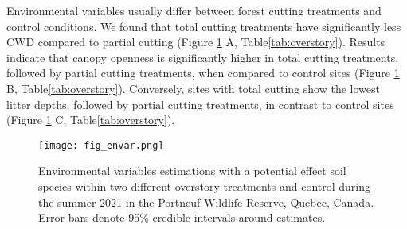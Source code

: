 Environmental variables usually differ between forest cutting treatments and control conditions. We found that total cutting treatments have significantly less CWD compared to partial cutting (Figure \ref{fig:envar} A, Table\ref{tab:overstory}). 
Results indicate that canopy openness is significantly higher in total cutting treatments, followed by partial cutting treatments, when compared to control sites (Figure \ref{fig:envar} B, Table\ref{tab:overstory}). 
Conversely, sites with total cutting show the lowest litter depths, followed by partial cutting treatments, in contrast to control sites (Figure \ref{fig:envar} C, Table\ref{tab:overstory}).

\vspace{0.5cm}

\begin{figure}[ht]
  \centering
  \texttt{[image: fig\_envar.png]}
  \caption[Environmental variables estimations with a potential effect soil species within two different overstory treatments and control.]
  {Environmental variables estimations with a potential effect soil species within two different overstory treatments and control 
  during the summer 2021 in the Portneuf Wildlife Reserve, Quebec, Canada. Error bars denote 95\% credible intervals around estimates.}
  \label{fig:envar}
\end{figure}

\vspace{0.5cm}

